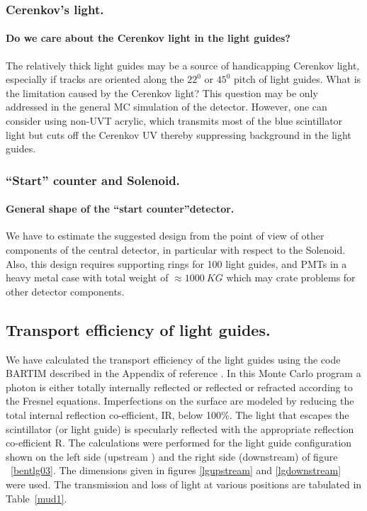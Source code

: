 \subsubsection{Cerenkov's light.}
\paragraph{Do we care about the Cerenkov light in the light guides?}
The relatively thick light guides may be a source of handicapping Cerenkov light, especially
if tracks are oriented along the $22^0$ or $45^0$ pitch of  light guides.
What is the limitation caused  by  the Cerenkov light? 
This question may be only addressed in the general MC simulation of the detector.
 However, one can consider using non-UVT acrylic, which transmits
most of the blue scintillator light but cuts off the Cerenkov UV thereby
suppressing background in the light guides.

\subsubsection{``Start'' counter and Solenoid.}
\paragraph{General shape of the ``start counter''detector.}
We have to estimate the suggested design from the point of view of other components of 
the central detector, in particular with respect to the Solenoid. 
Also, this  design requires  supporting rings for 100  light guides,
and PMTs in a heavy metal case   with total weight of $\approx1000~KG$ which may crate problems for 
other detector components.  








\subsection{Transport efficiency of light guides.}
We have calculated the transport efficiency of the light guides using the code BARTIM described in the Appendix of reference \cite{mutch}. 
In this Monte Carlo program a photon is either totally internally reflected or reflected or refracted according to the Fresnel equations. 
Imperfections on the surface are modeled by reducing the total internal reflection co-efficient, IR, below 100\%. 
The light that escapes the scintillator (or light guide) is specularly reflected with the appropriate reflection co-efficient R.
The calculations were performed for the light guide configuration shown on the left side (upstream ) and the right side (downstream) of figure ~\ref{bentlg03}. 
The dimensions given in figures \ref{lgupstream} and \ref{lgdownstream} were used. 
The transmission and loss of light at various positions are tabulated in Table~\ref{mud1}.

